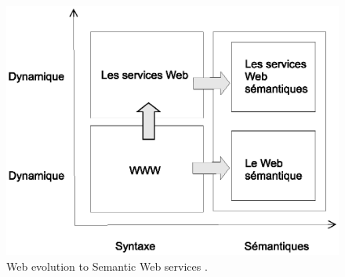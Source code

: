 \begin{figure}[h]
    \centering
    \includegraphics[width=1\textwidth]{figs/3w_to_sws.eps}
    \caption{Web evolution to Semantic Web services \cite{fensel2002semantic}.}
    \label{fig:3w_to_sws}
\end{figure}